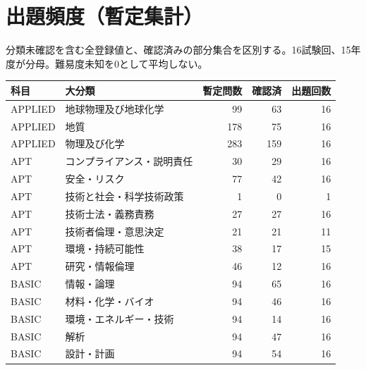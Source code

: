 \chapter{出題頻度（暫定集計）}
分類未確認を含む全登録値と、確認済みの部分集合を区別する。16試験回、15年度が分母。難易度未知を0として平均しない。
\begin{longtable}{p{.16\linewidth}p{.42\linewidth}rrr}
科目 & 大分類 & 暫定問数 & 確認済 & 出題回数\\\hline
APPLIED & 地球物理及び地球化学 & 99 & 63 & 16\\
APPLIED & 地質 & 178 & 75 & 16\\
APPLIED & 物理及び化学 & 283 & 159 & 16\\
APT & コンプライアンス・説明責任 & 30 & 29 & 16\\
APT & 安全・リスク & 77 & 42 & 16\\
APT & 技術と社会・科学技術政策 & 1 & 0 & 1\\
APT & 技術士法・義務責務 & 27 & 27 & 16\\
APT & 技術者倫理・意思決定 & 21 & 21 & 11\\
APT & 環境・持続可能性 & 38 & 17 & 15\\
APT & 研究・情報倫理 & 46 & 12 & 16\\
BASIC & 情報・論理 & 94 & 65 & 16\\
BASIC & 材料・化学・バイオ & 94 & 46 & 16\\
BASIC & 環境・エネルギー・技術 & 94 & 14 & 16\\
BASIC & 解析 & 94 & 47 & 16\\
BASIC & 設計・計画 & 94 & 54 & 16\\
\end{longtable}
